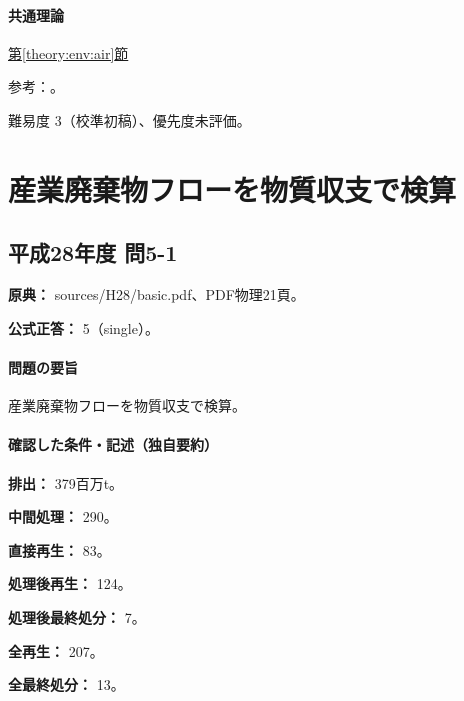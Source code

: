 \paragraph{共通理論} \hyperref[theory:env:air]{第\ref*{theory:env:air}節}

\par 参考：\cite{env58_pmstandard,env58_pm25}。

\par 難易度 3（校準初稿）、優先度未評価。

\section{産業廃棄物フローを物質収支で検算}

\subsection{平成28年度 問5-1}
\label{q:h28-reg-basic-5-1}

\noindent\textbf{原典：} sources/H28/basic.pdf、PDF物理21頁。

\textbf{公式正答：} 5（single）。

\paragraph{問題の要旨} 産業廃棄物フローを物質収支で検算。

\paragraph{確認した条件・記述（独自要約）}\mbox{}\par

\noindent\textbf{排出：} 379百万t。\par

\noindent\textbf{中間処理：} 290。\par

\noindent\textbf{直接再生：} 83。\par

\noindent\textbf{処理後再生：} 124。\par

\noindent\textbf{処理後最終処分：} 7。\par

\noindent\textbf{全再生：} 207。\par

\noindent\textbf{全最終処分：} 13。\par

